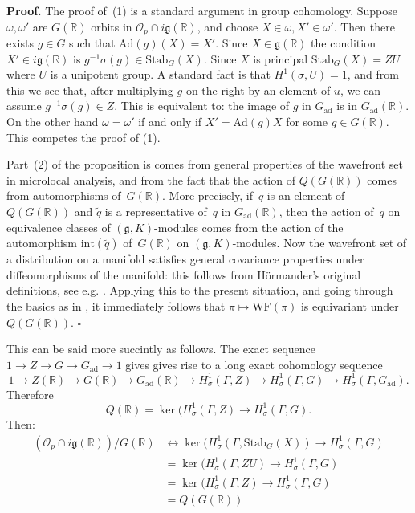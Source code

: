 \documentclass[10pt,leqno]{article}
\newcommand{\qed}{\hfill $\square$ \medskip}
\newenvironment{proof}[1][Proof]{\noindent\textbf{#1.} }{\qed}
\newcommand{\Ad}{\mathrm{Ad}}
\newcommand{\Gad}{G_\mathrm{ad}}
\newcommand{\Stab}{\mathrm{Stab}}
\renewcommand{\O}{\mathcal O}
\newcommand{\R}{\mathbb R}
\newcommand{\g}{\mathfrak g}
\newcommand\inv{^{-1}}
\newcommand{\WF}{\mathrm{WF}}
\newcommand{\Op}{\O_p}
\begin{document}
\begin{proof}
The proof of~(1) is a standard argument in group cohomology. Suppose $\omega,\omega'$ are $G(\R)$ orbits in $\Op\cap i\g(\R)$,
and choose $X\in \omega,X'\in\omega'$. Then there exists $g\in G$ such that $\Ad(g)(X)=X'$. Since $X\in \g(\R)$ the condition $X'\in i\g(\R)$ 
is $g\inv \sigma(g)\in \Stab_G(X)$.  Since $X$ is principal $\Stab_G(X)=ZU$ where $U$ is a unipotent group. 
A standard fact is that $H^1(\sigma,U)=1$, and from this we see that, after multiplying $g$ on the right by an element of $u$, we can assume $g\inv \sigma(g)\in Z$. This is equivalent to: the image of $g$ in $\Gad$ is in $\Gad(\R)$. On the other hand $\omega=\omega'$ 
if and only if $X'=\Ad(g)X$ for some $g\in G(\R)$. This competes the proof of (1).

Part~(2) of the proposition is comes from general properties of the wavefront set in microlocal analysis, and from the fact that the action of $Q(G(\R))$ comes from automorphisms of~$G(\R)$. More precisely, if~$q$ is an element of~$Q(G(\R))$ and $\tilde{q}$ is a representative of~$q$ in $\Gad(\R)$, then the action of~$q$ on equivalence classes of $(\g, K)$-modules comes from the action of the automorphism $\mathrm{int}(\tilde{q})$ of~$G(\R)$ on $(\g, K)$-modules. Now the wavefront set of a distribution on a manifold satisfies general covariance properties under diffeomorphisms of the manifold: this follows from Hörmander's original definitions, see e.g. \cite[Section 2, p.~800]{HarrisHeOlafsson}. Applying this to the present situation, and going through the basics as in   \cite[Section 2]{HarrisHeOlafsson}, it immediately follows that $\pi \mapsto \WF(\pi)$ is equivariant under $Q(G(\R))$.
\end{proof}

This can be said more succintly as follows.
The exact sequence $1\rightarrow Z \rightarrow G \rightarrow \Gad\rightarrow 1$ gives 
gives rise to a long exact cohomology sequence
\begin{equation} \label{long_ptset}
1\rightarrow Z(\R) \rightarrow G(\R) \rightarrow \Gad(\R) \rightarrow H^1_\sigma(\Gamma,Z)\rightarrow H^1_\sigma(\Gamma,G)\rightarrow H^1_\sigma(\Gamma,\Gad).
\end{equation}
Therefore
$$
Q(\R)=\ker(H^1_\sigma(\Gamma,Z)\rightarrow H^1_\sigma(\Gamma,G).
$$
Then:
$$
\begin{aligned}
(\Op\cap i\g(\R))/G(\R)&\leftrightarrow \ker(H^1_\sigma(\Gamma,\Stab_G(X))\rightarrow H^1_\sigma(\Gamma,G)\\
&=
\ker(H^1_\sigma(\Gamma,ZU)\rightarrow H^1_\sigma(\Gamma,G)\\
&=
\ker(H^1_\sigma(\Gamma,Z)\rightarrow H^1_\sigma(\Gamma,G)\\
&=Q(G(\R))
\end{aligned}
$$
\end{document}
